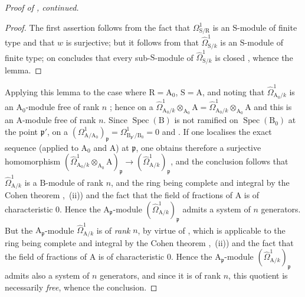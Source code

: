 \begin{proof}[Proof of {}, continued]
\begin{proof}
The first assertion follows from the fact that $\Omega^1_{\mathrm{S}/\mathrm{R}}$ is an $\mathrm{S}$-module of finite type  and that $w$ is surjective; but it follows from  that $\hat{\Omega}^1_{\mathrm{S}/k}$ is an $\mathrm{S}$-module of finite type; on concludes that every sub-$\mathrm{S}$-module of $\hat{\Omega}^1_{\mathrm{S}/k}$ is closed , whence the lemma.
\end{proof}

Applying this lemma to the case where $\mathrm{R}=\mathrm{A}_0$, $\mathrm{S}=\mathrm{A}$, and noting that $\hat{\Omega}^1_{\mathrm{A}_0/k}$ is an $\mathrm{A}_0$-module free of rank $n$ ; hence on a $\hat{\Omega}^1_{\mathrm{A}_0/k}\otimes_{\mathrm{A}_0}\mathrm{A}=\hat{\Omega}^1_{\mathrm{A}_0/k}\otimes_{\mathrm{A}_0}\mathrm{A}$ and this is an $\mathrm{A}$-module free of rank $n$.
Since $\operatorname{Spec}(\mathrm{B})$ is not ramified on $\operatorname{Spec}(\mathrm{B}_0)$ at the point $\mathfrak{p}'$, on a $(\Omega^1_{\mathrm{A}/\mathrm{A}_0})_\mathfrak{p}=\Omega^1_{\mathrm{B}_{\mathfrak{p}'}/\mathrm{B}_0}=0$  and .
If one localises the exact sequence  (applied to $\mathrm{A}_0$ and $\mathrm{A}$) at $\mathfrak{p}$, one obtains therefore a surjective homomorphism $(\hat{\Omega}^1_{\mathrm{A}_0/k}\otimes_{\mathrm{A}_0}\mathrm{A})_\mathfrak{p}\to(\hat{\Omega}^1_{\mathrm{A}/k})_\mathfrak{p}$, and the conclusion follows that $\hat{\Omega}^1_{\mathrm{A}/k}$ is a $\mathrm{B}$-module of rank $n$, and the ring being complete and integral by the Cohen theorem ,~(ii)) and the fact that the field of fractions of $\mathrm{A}$ is of characteristic $0$.
Hence the $\mathrm{A}_\mathfrak{p}$-module $(\hat{\Omega}^1_{\mathrm{A}/k})_\mathfrak{p}$ admits a system of $n$ generators.
But the $\mathrm{A}_\mathfrak{p}$-module $\hat{\Omega}^1_{\mathrm{A}/k}$ is of \emph{rank} $n$, by virtue of , which is applicable to the ring being complete and integral by the Cohen theorem ,~(ii)) and the fact that the field of fractions of $\mathrm{A}$ is of characteristic $0$.
Hence the $\mathrm{A}_\mathfrak{p}$-module $(\hat{\Omega}^1_{\mathrm{A}/k})_\mathfrak{p}$ admits also a system of $n$ generators, and since it is of rank $n$, this quotient is necessarily \emph{free}, whence the conclusion.
\end{proof}

